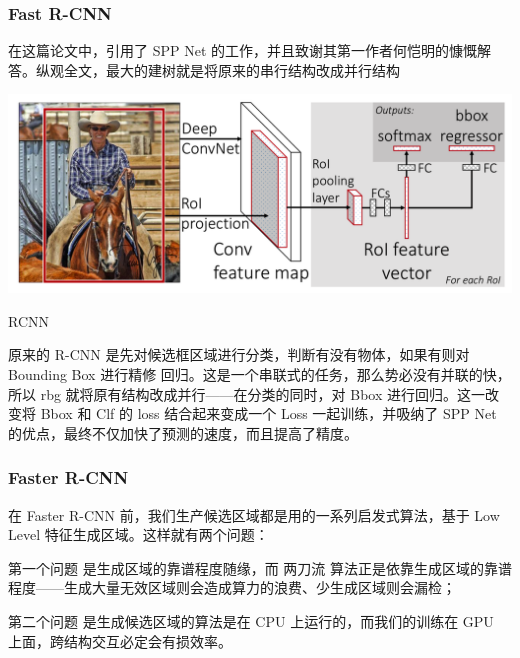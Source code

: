 \subsubsection{Fast R-CNN}
在这篇论文中，引用了 SPP Net 的工作，并且致谢其第一作者何恺明的慷慨解答。纵观全文，最大的建树就是将原来的串行结构改成并行结构
\begin{uscfigure}
	\includegraphics[width=\textwidth]{./Pictures/fast_rcnn.png}	
	\caption{RCNN}	
\end{uscfigure}
原来的 R-CNN 是先对候选框区域进行分类，判断有没有物体，如果有则对 Bounding Box 进行精修 回归。这是一个串联式的任务，那么势必没有并联的快，所以 rbg 就将原有结构改成并行——在分类的同时，对 Bbox 进行回归。这一改变将 Bbox 和 Clf 的 loss 结合起来变成一个 Loss 一起训练，并吸纳了 SPP Net 的优点，最终不仅加快了预测的速度，而且提高了精度。
\subsubsection{Faster R-CNN}
在 Faster R-CNN 前，我们生产候选区域都是用的一系列启发式算法，基于 Low Level 特征生成区域。这样就有两个问题：

第一个问题 是生成区域的靠谱程度随缘，而 两刀流 算法正是依靠生成区域的靠谱程度——生成大量无效区域则会造成算力的浪费、少生成区域则会漏检；

第二个问题 是生成候选区域的算法是在 CPU 上运行的，而我们的训练在 GPU 上面，跨结构交互必定会有损效率。

